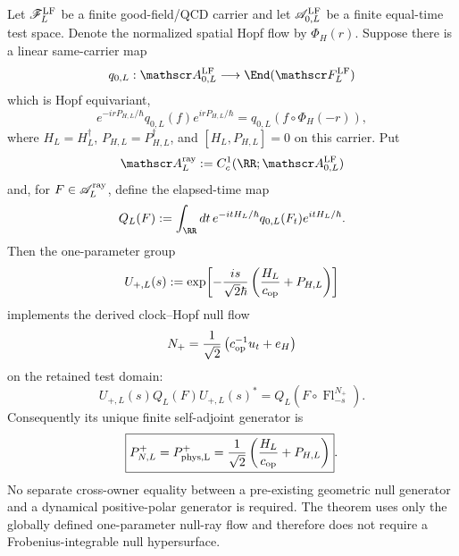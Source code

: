 \documentclass[12pt,a4paper]{article}
\begin{document}
\begin{theorem}
\label{p10:thm:v252-derived-null-generator-identity}
Let \(\mathscr F_L^{\rm LF}\) be a finite good-field/QCD carrier and let
\(\mathscr A_{0,L}^{\rm LF}\) be a finite equal-time test space.  Denote the
normalized spatial Hopf flow by \(\Phi_H(r)\).  Suppose there is a linear
same-carrier map
\[
 q_{0,L}:\mathscr A_{0,L}^{\rm LF}
 \longrightarrow \End(\mathscr F_L^{\rm LF})
\]
which is Hopf equivariant,
\begin{equation}
\label{p10:eq:v252-equal-time-hopf-seed}
 e^{-irP_{H,L}/\hbar}q_{0,L}(f)e^{irP_{H,L}/\hbar}
 =q_{0,L}(f\circ\Phi_H(-r)),
\end{equation}
where \(H_L=H_L^\dagger\), \(P_{H,L}=P_{H,L}^\dagger\), and
\([H_L,P_{H,L}]=0\) on this carrier.  Put
\[
 \mathscr A_L^{\rm ray}:=C_c^1(\RR;\mathscr A_{0,L}^{\rm LF})
\]
and, for \(F\in\mathscr A_L^{\rm ray}\), define the elapsed-time map
\begin{equation}
\label{p10:eq:v252-elapsed-test-map}
 Q_L(F):=\int_{\RR}dt\,
 e^{-itH_L/\hbar}q_{0,L}(F_t)e^{itH_L/\hbar}.
\end{equation}
Then the one-parameter group
\begin{equation}
\label{p10:eq:v252-derived-null-unitary}
 U_{+,L}(s):=
 \exp\!\left[-\frac{is}{\sqrt2\hbar}
 \left(\frac{H_L}{c_{\rm op}}+P_{H,L}\right)\right]
\end{equation}
implements the derived clock--Hopf null flow
\[
 N_+=\frac1{\sqrt2}\left(c_{\rm op}^{-1}u_t+e_H\right)
\]
on the retained test domain:
\begin{equation}
\label{p10:eq:v252-derived-null-equivariance}
 U_{+,L}(s)Q_L(F)U_{+,L}(s)^*
 =Q_L\!\left(F\circ\operatorname{Fl}^{N_+}_{-s}\right).
\end{equation}
Consequently its unique finite self-adjoint generator is
\begin{equation}
\label{p10:eq:v252-physical-null-generator-identity}
 \boxed{
 P_{N,L}^+=P_{\rm phys,L}^+
 =\frac1{\sqrt2}\left(\frac{H_L}{c_{\rm op}}+P_{H,L}\right)}.
\end{equation}
No separate cross-owner equality between a pre-existing geometric null
generator and a dynamical positive-polar generator is required.  The theorem
uses only the globally defined one-parameter null-ray flow and therefore does
not require a Frobenius-integrable null hypersurface.
\end{theorem}
\end{document}
